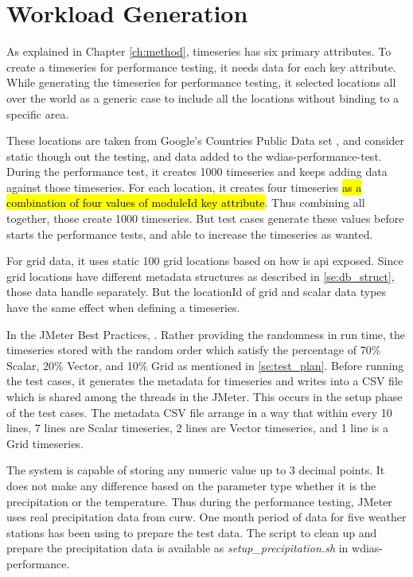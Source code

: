 \section{Workload Generation}
\label{se:workload}

As explained in Chapter \ref{ch:method}, timeseries has six primary attributes. To create a timeseries for performance testing, it needs data for each key attribute.
While generating the timeseries for performance testing, it selected locations all over the world as a generic case to include all the locations without binding to a specific area.

These locations are taken from Google's Countries Public Data set \cite{GoogleGoogleCounties}, and consider static though out the testing, and data added to the wdias-performance-test.
During the performance test, it creates 1000 timeseries and keeps adding data against those timeseries. For each location, it creates four timeseries \hl{as a combination of four values of moduleId key attribute}. Thus combining all together, those create 1000 timeseries. But test cases generate these values before starts the performance tests, and able to increase the timeseries as wanted.

For grid data, it uses static 100 grid locations based on how is \acrshort{api} exposed. Since grid locations have different metadata structures as described in \cref{se:db_struct}, those data handle separately. But the locationId of grid and scalar data types have the same effect when defining a timeseries.

In the  JMeter Best Practices, . Rather providing the randomness in run time, the timeseries stored with the random order which satisfy the percentage of 70\% Scalar, 20\% Vector, and 10\% Grid as mentioned in \cref{se:test_plan}.
Before running the test cases, it generates the metadata for timeseries and writes into a CSV file which is shared among the threads in the  JMeter. This occurs in the setup phase of the test cases. The metadata CSV file arrange in a way that within every 10 lines, 7 lines are Scalar timeseries, 2 lines are Vector timeseries, and 1 line is a Grid timeseries.

The system is capable of storing any numeric value up to 3 decimal points. It does not make any difference based on the parameter type whether it is the precipitation or the temperature. Thus during the performance testing,  JMeter uses real precipitation data from \acrshort{curw}. One month period of data for five weather stations has been using to prepare the test data. The script to clean up and prepare the precipitation data is available as \emph{setup\_precipitation.sh} in wdias-performance.

